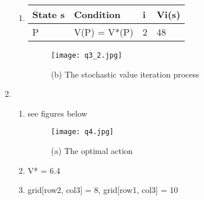 \documentclass[12pt]{article}
\begin{document}
\begin{enumerate}
\begin{enumerate}
  \item
    \begin{tabular}{llll}
    \hline
    State s & Condition    & i & Vi(s) \\ \hline
    P       & V(P) = V*(P) & 2  & 48     
    \end{tabular}

    \begin{figure}[h]
    \centering
    \texttt{[image: q3\_2.jpg]}
    \caption{(b) The stochastic value iteration process}
    \label{fig:hw6_2}
    \end{figure}
  \end{enumerate}  
\item 
  \begin{enumerate}
    \item  see figures below
      \begin{figure}[h]
      \centering
      \texttt{[image: q4.jpg]}
      \caption{(a) The optimal action}
      \label{fig:hw6_3}
      \end{figure}
    \item V* = 6.4
    \item grid[row2, col3] = 8, grid[row1, col3] = 10
  \end{enumerate}
\end{enumerate}
\end{document}
